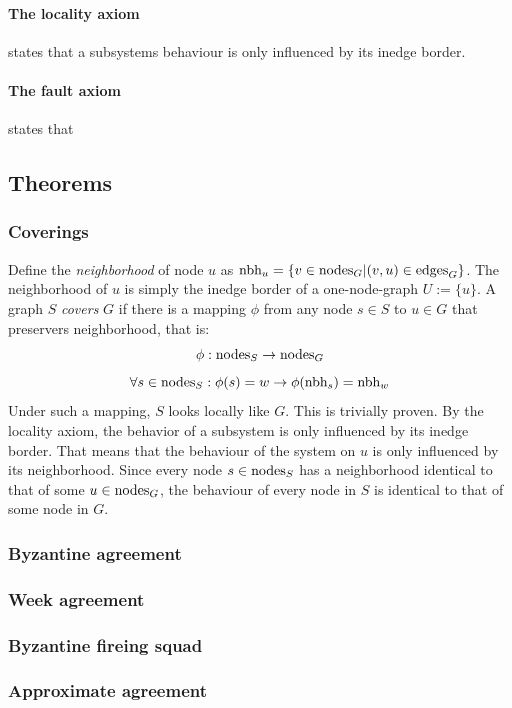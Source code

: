 \paragraph{The locality axiom} states that a subsystems behaviour is only influenced by its inedge border.
\paragraph{The fault axiom} states that 

\subsection{Theorems}

\subsubsection{Coverings}
Define the \emph{neighborhood} of node $u$ as $\text{nbh}_u = \{ v \in  \text{nodes}_{G}  | (v, u) \in  \text{edges}_{G}  \}$. The neighborhood of $u$ is simply the inedge border of a one-node-graph $U := \{u\}$. A graph $S$ \emph{covers} $G$ if there is a mapping $\phi$ from any node $s \in S$ to $u \in G$ that preservers neighborhood, that is: 
$$ \phi:  \text{nodes}_{S}  \to  \text{nodes}_{G}  $$
$$ \forall s \in  \text{nodes}_{S} : \phi(s) = w \to \phi( \text{nbh}_s ) = \text{nbh}_w $$
Under such a mapping, $S$ looks locally like $G$. This is trivially proven. By the locality axiom, the behavior of a subsystem is only influenced by its inedge border. That means that the behaviour of the system on $u$ is only influenced by its neighborhood. Since every node $s \in  \text{nodes}_{S} $ has a neighborhood identical to that of some $u \in  \text{nodes}_{G} $, the behaviour of every node in $S$ is identical to that of some node in $G$.

\subsubsection{Byzantine agreement}
\subsubsection{Week agreement}
\subsubsection{Byzantine fireing squad}
\subsubsection{Approximate agreement}
